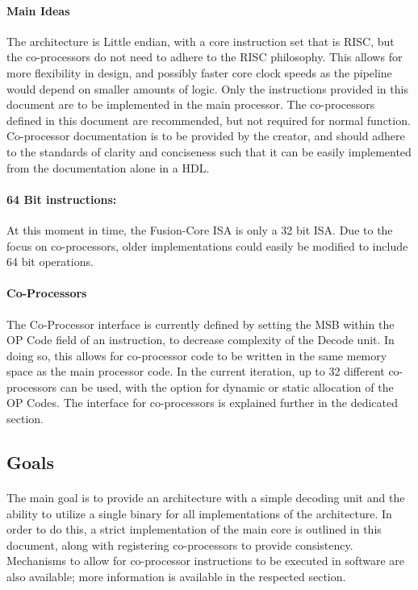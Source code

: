 \documentclass[letterpaper, 11pt]{article}
\begin{document}
\paragraph{Main Ideas}The architecture is Little endian, with a core instruction set that is RISC, but the co-processors do not need to adhere to the RISC philosophy. This allows for more flexibility in design, and possibly faster core clock speeds as the pipeline would depend on smaller amounts of logic. Only the instructions provided in this document are to be implemented in the main processor. The co-processors defined in this document are recommended, but not required for normal function. Co-processor documentation is to be provided by the creator, and should adhere to the standards of clarity and conciseness such that it can be easily implemented from the documentation alone in a HDL. 
\paragraph{64 Bit instructions:}At this moment in time, the Fusion-Core ISA is only a 32 bit ISA. Due to the focus on co-processors,
older implementations could easily be modified to include 64 bit operations.
\paragraph{Co-Processors}The Co-Processor interface is currently defined by setting the MSB within the OP Code field of 
an instruction, to decrease complexity of the Decode unit. In doing so, this allows for co-processor code to be written in the same memory space as the main processor code. In the current iteration, up to 32 different co-processors can be used, with the option for dynamic or static allocation of the OP Codes. The interface for co-processors is explained further in the dedicated section.

\subsection{Goals}
\paragraph{}The main goal is to provide an architecture with a simple decoding unit and the ability to utilize a single binary for all implementations of the architecture.
In order to do this, a strict implementation of the main core is outlined in this document, along with registering co-processors to provide consistency. 
Mechanisms to allow for co-processor instructions to be executed in software are also available; more information is available in the respected section.
\end{document}
